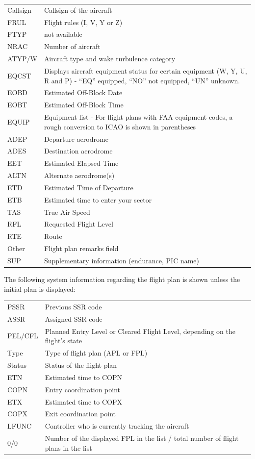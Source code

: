 \documentclass[11pt,a4paper]{memoir}
\begin{document}
\begin{tabular}{l l}
    Callsign    & Callsign of the aircraft\\
    FRUL        & Flight rules (I, V, Y or Z)\\
    FTYP        & not available\\
    NRAC        & Number of aircraft\\
    ATYP/W      & Aircraft type and wake turbulence category\\
    EQCST       & Displays aircraft equipment status for certain equipment (W, Y, U, R and P) - “EQ” equipped, “NO” not equipped, “UN” unknown.\\
    EOBD        & Estimated Off-Block Date\\
    EOBT        & Estimated Off-Block Time\\
    EQUIP       & Equipment list - For flight plans with FAA equipment codes, a rough conversion to ICAO is shown in parentheses\\
    ADEP        & Departure aerodrome\\
    ADES        & Destination aerodrome\\
    EET         & Estimated Elapsed Time\\
    ALTN        & Alternate aerodrome(s)\\
    ETD         & Estimated Time of Departure\\
    ETB         & Estimated time to enter your sector\\
    TAS         & True Air Speed\\
    RFL         & Requested Flight Level\\
    RTE         & Route\\
    Other       & Flight plan remarks field\\
    SUP         & Supplementary information (endurance, PIC name)\\
\end{tabular}

The following system information regarding the flight plan is shown unless the initial plan is displayed:

\begin{tabular}{l l}
    PSSR    & Previous SSR code\\
    ASSR    & Assigned SSR code\\
    PEL/CFL & Planned Entry Level or Cleared Flight Level, depending on the flight’s state\\
    Type    & Type of flight plan (APL or FPL)\\
    Status  & Status of the flight plan\\
    ETN     & Estimated time to COPN\\
    COPN    & Entry coordination point\\
    ETX     & Estimated time to COPX\\
    COPX    & Exit coordination point\\
    LFUNC   & Controller who is currently tracking the aircraft\\
    0/0     & Number of the displayed FPL in the list / total number of flight plans in the list\\
\end{tabular}
\end{document}
